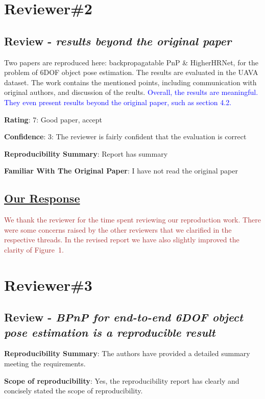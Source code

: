 \documentclass{article}
\begin{document}
\section{Reviewer\#2}
\subsection{Review - \textit{results beyond the original paper}}

Two papers are reproduced here: backpropagatable PnP \& HigherHRNet, for the problem of 6DOF object pose estimation. 
The results are evaluated in the UAVA dataset. 
The work contains the mentioned points, including communication with original authors, and discussion of the reults.
\textcolor{blue}{Overall, the results are meaningful. 
They even present results beyond the original paper, such as section 4.2.}

\textbf{Rating}: 7: Good paper, accept

\textbf{Confidence}: 3: The reviewer is fairly confident that the evaluation is correct

\textbf{Reproducibility Summary}: Report has summary

\textbf{Familiar With The Original Paper}: I have not read the original paper

\subsection{\uline{Our Response}}

\textcolor{brown}{
We thank the reviewer for the time spent reviewing our reproduction work.
There were some concerns raised by the other reviewers that we clarified in the respective threads.
In the revised report we have also slightly improved the clarity of Figure~1.
}

\section{Reviewer\#3}
\subsection{Review - \textit{BPnP for end-to-end 6DOF object pose estimation is a reproducible result}}

\textbf{Reproducibility Summary}: The authors have provided a detailed summary meeting the requirements.

\textbf{Scope of reproducibility}: Yes, the reproducibility report has clearly and concisely stated the scope of reproducibility.
\end{document}
